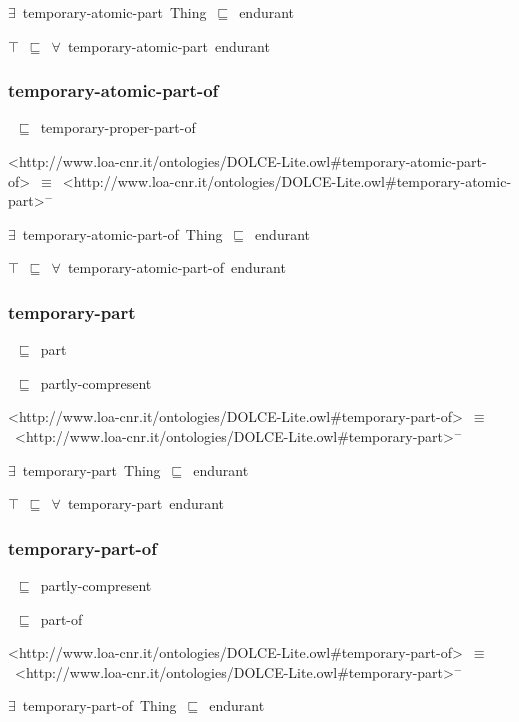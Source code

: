\documentclass{article}
\begin{document}
\ensuremath{\exists}~temporary-atomic-part~Thing~\ensuremath{\sqsubseteq}~endurant

\ensuremath{\top}~\ensuremath{\sqsubseteq}~\ensuremath{\forall}~temporary-atomic-part~endurant

\subsubsection*{temporary-atomic-part-of}

~\ensuremath{\sqsubseteq}~temporary-proper-part-of

<http://www.loa-cnr.it/ontologies/DOLCE-Lite.owl#temporary-atomic-part-of>~\ensuremath{\equiv}~<http://www.loa-cnr.it/ontologies/DOLCE-Lite.owl#temporary-atomic-part>\ensuremath{^-}

\ensuremath{\exists}~temporary-atomic-part-of~Thing~\ensuremath{\sqsubseteq}~endurant

\ensuremath{\top}~\ensuremath{\sqsubseteq}~\ensuremath{\forall}~temporary-atomic-part-of~endurant

\subsubsection*{temporary-part}

~\ensuremath{\sqsubseteq}~part

~\ensuremath{\sqsubseteq}~partly-compresent

<http://www.loa-cnr.it/ontologies/DOLCE-Lite.owl#temporary-part-of>~\ensuremath{\equiv}~<http://www.loa-cnr.it/ontologies/DOLCE-Lite.owl#temporary-part>\ensuremath{^-}

\ensuremath{\exists}~temporary-part~Thing~\ensuremath{\sqsubseteq}~endurant

\ensuremath{\top}~\ensuremath{\sqsubseteq}~\ensuremath{\forall}~temporary-part~endurant

\subsubsection*{temporary-part-of}

~\ensuremath{\sqsubseteq}~partly-compresent

~\ensuremath{\sqsubseteq}~part-of

<http://www.loa-cnr.it/ontologies/DOLCE-Lite.owl#temporary-part-of>~\ensuremath{\equiv}~<http://www.loa-cnr.it/ontologies/DOLCE-Lite.owl#temporary-part>\ensuremath{^-}

\ensuremath{\exists}~temporary-part-of~Thing~\ensuremath{\sqsubseteq}~endurant
\end{document}
